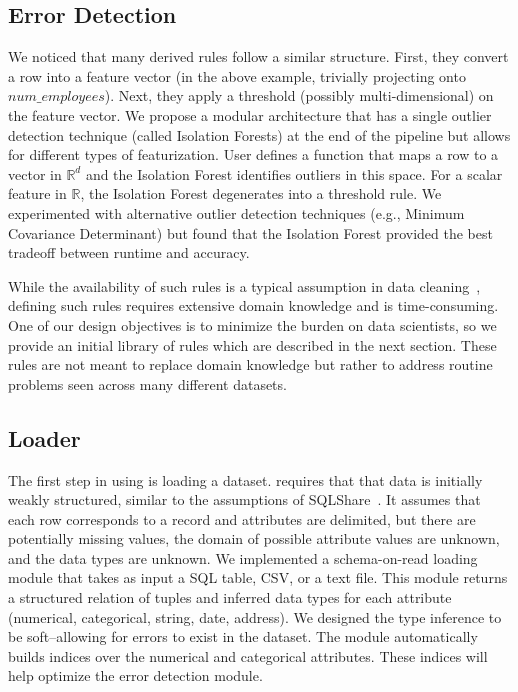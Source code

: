\subsection{Error Detection}
We noticed that many derived rules follow a similar structure.
First, they convert a row into a feature vector (in the above example, trivially projecting onto $num\_employees$).
Next, they apply a threshold (possibly multi-dimensional) on the feature vector.
We propose a modular architecture that has a single outlier detection technique (called Isolation Forests) at the end of the pipeline but allows for different types of featurization.
User defines a function that maps a row to a vector in $\mathbb{R}^d$ and the Isolation Forest identifies outliers in this space.
For a scalar feature in $\mathbb{R}$, the Isolation Forest degenerates into a threshold rule. 
We experimented with alternative outlier detection techniques (e.g., Minimum Covariance Determinant) but found that the Isolation Forest provided the best tradeoff between runtime and accuracy.

While the availability of such rules is a typical assumption in data cleaning~\cite{DBLP:conf/sigmod/ChuIKW16},  defining such rules requires extensive domain knowledge and is time-consuming.
One of our design objectives is to minimize the burden on data scientists, so we provide an initial library of rules which are described in the next section.
These rules are not meant to replace domain knowledge but rather to address routine problems seen across many different datasets.



\subsection{Loader}
The first step in using \sys is loading a dataset. \sys requires that that data is initially weakly structured, similar to the assumptions of SQLShare~\cite{howe2013sqlshare}. It assumes that each row corresponds to a record and attributes are delimited, but there are potentially missing values, the domain of possible attribute values are unknown, and the data types are unknown.
We implemented a schema-on-read loading module that takes as input a SQL table, CSV, or a text file.
This module returns a structured relation of tuples and inferred data types for each attribute (numerical, categorical, string, date, address).
We designed the type inference to be soft--allowing for errors to exist in the dataset.
The module automatically builds indices over the numerical and categorical attributes.
These indices will help optimize the error detection module.




